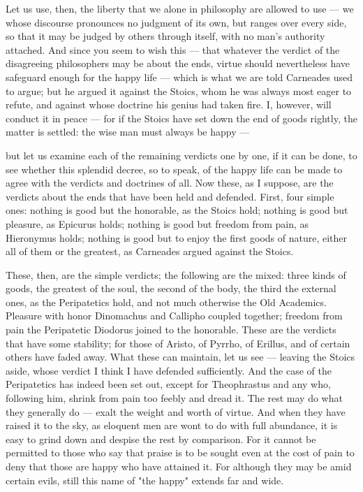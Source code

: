  Let us use, then, the liberty that we alone in philosophy are allowed to use — we whose discourse pronounces no judgment of its own, but ranges over every side, so that it may be judged by others through itself, with no man's authority attached. And since you seem to wish this — that whatever the verdict of the disagreeing philosophers may be about the ends, virtue should nevertheless have safeguard enough for the happy life — which is what we are told Carneades used to argue; but he argued it against the Stoics, whom he was always most eager to refute, and against whose doctrine his genius had taken fire. I, however, will conduct it in peace — for if the Stoics have set down the end of goods rightly, the matter is settled: the wise man must always be happy —

 but let us examine each of the remaining verdicts one by one, if it can be done, to see whether this splendid decree, so to speak, of the happy life can be made to agree with the verdicts and doctrines of all. Now these, as I suppose, are the verdicts about the ends that have been held and defended. First, four simple ones: nothing is good but the honorable, as the Stoics hold; nothing is good but pleasure, as Epicurus holds; nothing is good but freedom from pain, as Hieronymus holds; nothing is good but to enjoy the first goods of nature, either all of them or the greatest, as Carneades argued against the Stoics.

 These, then, are the simple verdicts; the following are the mixed: three kinds of goods, the greatest of the soul, the second of the body, the third the external ones, as the Peripatetics hold, and not much otherwise the Old Academics. Pleasure with honor Dinomachus and Callipho coupled together; freedom from pain the Peripatetic Diodorus joined to the honorable. These are the verdicts that have some stability; for those of Aristo, of Pyrrho, of Erillus, and of certain others have faded away. What these can maintain, let us see — leaving the Stoics aside, whose verdict I think I have defended sufficiently. And the case of the Peripatetics has indeed been set out, except for Theophrastus and any who, following him, shrink from pain too feebly and dread it. The rest may do what they generally do — exalt the weight and worth of virtue. And when they have raised it to the sky, as eloquent men are wont to do with full abundance, it is easy to grind down and despise the rest by comparison. For it cannot be permitted to those who say that praise is to be sought even at the cost of pain to deny that those are happy who have attained it. For although they may be amid certain evils, still this name of "the happy" extends far and wide.

